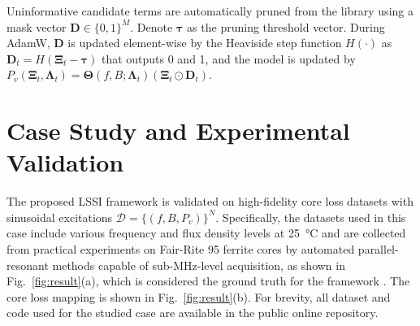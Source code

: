 \documentclass[lettersize,journal]{IEEEtran}
\begin{document}
Uninformative candidate terms are automatically pruned from the library using a mask vector $\mathbf{D} \in \{0, 1\}^M$. Denote $\boldsymbol{\tau}$ as the pruning threshold vector. During AdamW, $\mathbf{D}$ is updated element-wise by the Heaviside step function $H(\cdot)$ as $\mathbf{D}_t = H(\boldsymbol{\Xi}_t - \boldsymbol{\tau})$ that outputs 0 and 1, and the model is updated by ${P}_{v}(\boldsymbol{\Xi}_t, \boldsymbol{\Lambda}_t)= \boldsymbol{\Theta}(f, B; \boldsymbol{\Lambda}_t) (\boldsymbol{\Xi}_t \odot \mathbf{D}_t)$.

\section{Case Study and Experimental Validation} 

\begin{table}[t]
\centering
\caption{Predefined Hyperparameters for LSSI Training}
\vspace{-5pt}
\label{tab:hyperparameters}
\renewcommand{\arraystretch}{1.3}
\end{table}


The proposed LSSI framework is validated on high-fidelity core loss datasets with sinusoidal excitations $\mathcal{D} = \{(f, B, P_{v})\}^N$. Specifically, the datasets used in this case include various frequency and flux density levels at \SI{25}{\degreeCelsius} and are collected from practical experiments on Fair-Rite 95 ferrite cores by automated parallel-resonant methods capable of sub-MHz-level acquisition, as shown in Fig.~\ref{fig:result}(a), which is considered the ground truth for the framework \cite{11121265}. The core loss mapping is shown in Fig.~\ref{fig:result}(b). For brevity, all dataset and code used for the studied case are available in the public online repository\footnotemark.
\end{document}
